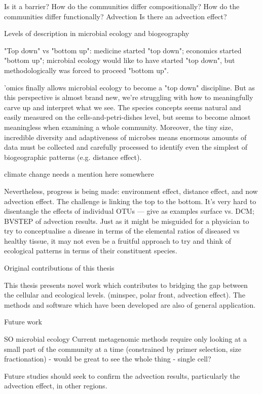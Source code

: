 Is it a barrier?
How do the communities differ compositionally?
How do the communities differ functionally?
Advection
Is there an advection effect?

Levels of description in microbial ecology and biogeography

"Top down" vs "bottom up": medicine started "top down"; economics started "bottom up"; microbial ecology would like to have started "top down", but methodologically was forced to proceed "bottom up".

'omics finally allows microbial ecology to become a "top down" discipline. But as this perspective is almost brand new, we're struggling with how to meaningfully carve up and interpret what we see. The species concepts seems natural and easily measured on the cells-and-petri-dishes level, but seems to become almost meaningless when examining a whole community. Moreover, the tiny size, incredible diversity and adaptiveness of microbes means enormous amounts of data must be collected and carefully processed to identify even the simplest of biogeographic patterns (e.g. distance effect).

climate change needs a mention here somewhere

Nevertheless, progress is being made: environment effect, distance effect, and now advection effect. The challenge is linking the top to the bottom. It's very hard to disentangle the effects of individual OTUs — give as examples surface vs. DCM; BVSTEP of advection results. Just as it might be misguided for a physician to try to conceptualise a disease in terms of the elemental ratios of diseased vs healthy tissue, it may not even be a fruitful approach to try and think of ecological patterns in terms of their constituent species.

Original contributions of this thesis

This thesis presents novel work which contributes to bridging the gap between the cellular and ecological levels. (minspec, polar front, advection effect). The methods and software which have been developed are also of general application.

Future work

SO microbial ecology
Current metagenomic methods require only looking at a small part of the community at a time (constrained by primer selection, size fractionation) - would be great to see the whole thing - single cell?


Future studies should seek to confirm the advection results, particularly the advection effect, in other regions.
